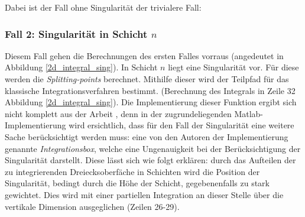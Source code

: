 Dabei ist der Fall ohne Singularität der trivialere Fall:

\begin{center}
    
    \label{2d_integral_trivial}
\end{center}


\subsubsection*{Fall 2: Singularität in Schicht $n$}

Diesem Fall gehen die Berechnungen des ersten Falles vorraus (angedeutet in Abbildung \ref{2d_integral_sing}).
In Schicht $n$ liegt eine Singularität vor. Für diese werden die \textit{Splitting-points} berechnet. Mithilfe dieser wird der Teilpfad für das klassische Integrationsverfahren bestimmt.
(Berechnung des Integrals in Zeile 32 Abbildung \ref{2d_integral_sing}).
Die Implementierung dieser Funktion ergibt sich nicht komplett aus der Arbeit \cite{gasperini:hal-03209144}, denn in der zugrundeliegenden Matlab-Implementierung wird ersichtlich, dass für den Fall der Singularität 
eine weitere Sache berücksichtigt werden muss: eine von den Autoren der Implementierung genannte \textit{Integrationsbox}, welche eine Ungenauigkeit bei der Berücksichtigung der Singularität darstellt.
Diese lässt sich wie folgt erklären: durch das Aufteilen der zu integrierenden Dreiecksoberfäche in Schichten wird die Position der Singularität, bedingt durch die \glqq Höhe\grqq{} der Schicht, gegebenenfalls zu stark gewichtet.
Dies wird mit einer partiellen Integration an dieser Stelle über die vertikale Dimension ausgeglichen (Zeilen 26-29).

\begin{center}
    
    \label{2d_integral_sing}
\end{center}

